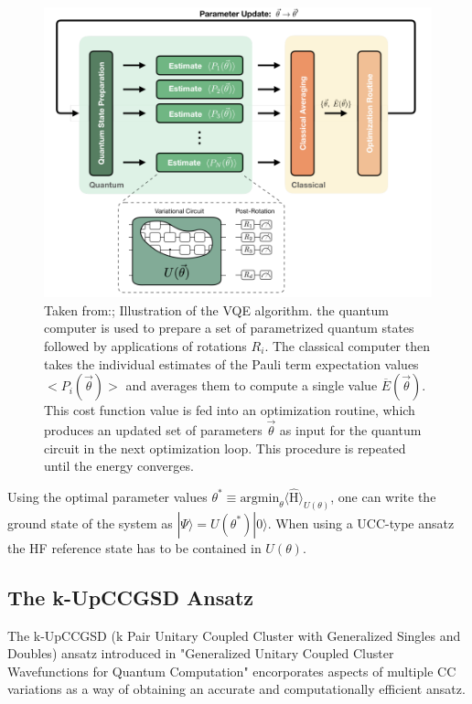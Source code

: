 \documentclass[twoside,twocolumn,9pt]{article}
\begin{document}
{\begin{center}
  \begin{figure}[h]
      \includegraphics[width=\linewidth]{VQE_precedure.png}
      \caption{Taken from:\cite{Cao2019}; Illustration of the VQE algorithm. the quantum computer is used to prepare a set of parametrized quantum states followed by applications of rotations $R_i$. The classical computer then takes the individual estimates of the Pauli term expectation values $<P_i(\stackrel{\rightarrow}{\theta})>$ and averages them to compute a single value $\overline{E}(\stackrel{\rightarrow}{\theta})$. This cost function value is fed into an optimization routine, which produces an updated set of parameters $\stackrel{\rightarrow}{\theta}$ as input for the quantum circuit in the next optimization loop. This procedure is repeated until the energy converges.}
      \label{fig:VQE} 
  \end{figure}
\end{center}

Using the optimal parameter values $\theta^*\equiv \text{argmin}_{\theta}\langle \hat{\text{H}} \rangle_{U(\theta)}$, one can write the ground state of the system as $|\Psi\rangle=U(\theta^*)|0\rangle$. When using a UCC-type ansatz the HF reference state has to be contained in $U(\theta)$.

\subsection{The k-UpCCGSD Ansatz}

The k-UpCCGSD (k Pair Unitary Coupled Cluster with Generalized Singles and Doubles) ansatz introduced in "Generalized Unitary Coupled Cluster Wavefunctions for Quantum Computation" \cite{Lee2019} encorporates aspects of multiple CC variations as a way of obtaining an accurate and computationally efficient ansatz.

}
\end{document}
